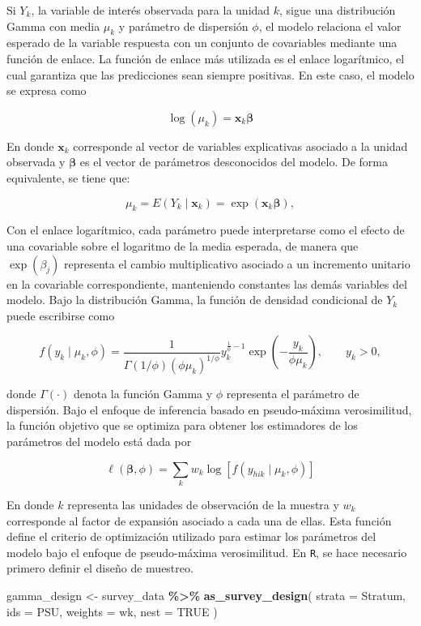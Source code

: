 \documentclass[
  spanish,
  12pt,
]{book}
\newenvironment{Shaded}{\begin{snugshade}}{\end{snugshade}}
\newcommand{\AttributeTok}[1]{\textcolor[rgb]{0.13,0.29,0.53}{#1}}
\newcommand{\ConstantTok}[1]{\textcolor[rgb]{0.56,0.35,0.01}{#1}}
\newcommand{\FunctionTok}[1]{\textcolor[rgb]{0.13,0.29,0.53}{\textbf{#1}}}
\newcommand{\NormalTok}[1]{#1}
\newcommand{\OtherTok}[1]{\textcolor[rgb]{0.56,0.35,0.01}{#1}}
\newcommand{\SpecialCharTok}[1]{\textcolor[rgb]{0.81,0.36,0.00}{\textbf{#1}}}
\begin{document}
Si \(Y_{k}\), la variable de interés observada para la unidad \(k\), sigue una distribución Gamma con media \(\mu_{k}\) y parámetro de dispersión \(\phi\), el modelo relaciona el valor esperado de la variable respuesta con un conjunto de covariables mediante una función de enlace. La función de enlace más utilizada es el enlace logarítmico, el cual garantiza que las predicciones sean siempre positivas. En este caso, el modelo se expresa como

\[
\log(\mu_{k})
=
\mathbf{x}_{k}\boldsymbol{\beta}
\]

En donde \(\mathbf{x}_{k}\) corresponde al vector de variables explicativas asociado a la unidad observada y \(\boldsymbol{\beta}\) es el vector de parámetros desconocidos del modelo. De forma equivalente, se tiene que:

\[
\mu_{k}
= E(Y_{k}\mid \mathbf{x}_{k})
=
\exp(\mathbf{x}_{k}\boldsymbol{\beta}),
\]

Con el enlace logarítmico, cada parámetro puede interpretarse como el efecto de una covariable sobre el logaritmo de la media esperada, de manera que \(\exp(\beta_j)\) representa el cambio multiplicativo asociado a un incremento unitario en la covariable correspondiente, manteniendo constantes las demás variables del modelo. Bajo la distribución Gamma, la función de densidad condicional de \(Y_{k}\) puede escribirse como

\[
f(y_{k}\mid \mu_{k},\phi)
=
\frac{1}
{\Gamma(1/\phi)
(\phi\mu_{k})^{1/\phi}}
y_{k}^{\frac{1}{\phi}-1}
\exp\left(
-\frac{y_{k}}
{\phi\mu_{k}}
\right),
\qquad y_{k}>0,
\]

donde \(\Gamma(\cdot)\) denota la función Gamma y \(\phi\) representa el parámetro de dispersión. Bajo el enfoque de inferencia basado en pseudo-máxima verosimilitud, la función objetivo que se optimiza para obtener los estimadores de los parámetros del modelo está dada por

\[
\ell(\boldsymbol{\beta},\phi)
=
\sum_{k}
w_{k}
\log
\left[
f(y_{hik}\mid\mu_{k},\phi)
\right]
\]

En donde \(k\) representa las unidades de observación de la muestra y \(w_k\) corresponde al factor de expansión asociado a cada una de ellas. Esta función define el criterio de optimización utilizado para estimar los parámetros del modelo bajo el enfoque de pseudo-máxima verosimilitud. En \texttt{R}, se hace necesario primero definir el diseño de muestreo.

\begin{Shaded}
\begin{Highlighting}[]
\NormalTok{gamma\_design }\OtherTok{\textless{}{-}}\NormalTok{ survey\_data }\SpecialCharTok{\%\textgreater{}\%}
  \FunctionTok{as\_survey\_design}\NormalTok{(}
    \AttributeTok{strata =}\NormalTok{ Stratum,}
    \AttributeTok{ids =}\NormalTok{ PSU,}
    \AttributeTok{weights =}\NormalTok{ wk,}
    \AttributeTok{nest =} \ConstantTok{TRUE}
\NormalTok{  )}
\end{Highlighting}
\end{Shaded}
\end{document}
